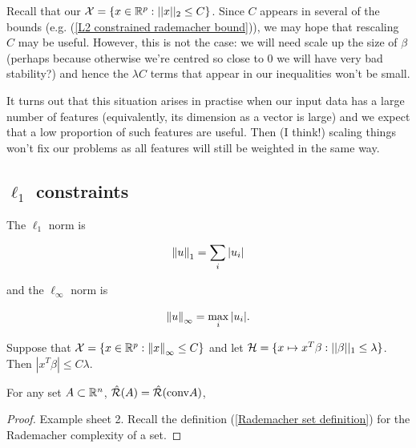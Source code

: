 \documentclass[11pt]{scrartcl}
\begin{document}

Recall that our $\mathcal{X} = \{ x \in \mathbb R^p : ||x||_2 \le C \}$. Since $C$ appears in several of the bounds (e.g. (\ref{L2 constrained rademacher bound})), we may hope that rescaling $C$ may be useful. However, this is not the case: we will need scale up the size of $\beta$ (perhaps because otherwise we're centred so close to 0 we will have very bad stability?) and hence the $\lambda C$ terms that appear in our inequalities won't be small.

It turns out that this situation arises in practise when our input data has a large number of features (equivalently, its dimension as a vector is large) and we expect that a low proportion of such features are useful. Then (I think!) scaling things won't fix our problems as all features will still be weighted in the same way.

\subsection{$\ell_1$ constraints}

\begin{definition}
The $\ell_1$ norm is 

\begin{equation}
    \left\lVert u\right\rVert_1 = \sum_i |u_i|
\end{equation}

and the $\ell_\infty$ norm is

\begin{equation}
    \left\lVert u\right\rVert_\infty = \max_i |u_i|.
\end{equation}
\end{definition}

Suppose that $\mathcal{X} = \{ x \in \mathbb R^p : \left\lVert x\right\rVert_\infty \le C \}$ and let $\mathcal{H} = \{ x \mapsto x^T \beta : ||\beta||_1 \le \lambda \}$. Then $|x^T \beta | \le C \lambda$. %

\begin{lemma}
\label{es2 lemma}
For any set $A \subset \mathbb R^n$, $\hat{\mathcal{R}}(A) = \hat{\mathcal{R}}(\text{conv} A)$,

\begin{proof}
Example sheet 2. Recall the definition (\ref{Rademacher set definition}) for the Rademacher complexity of a set. 
\end{proof}
\end{lemma}
\end{document}
